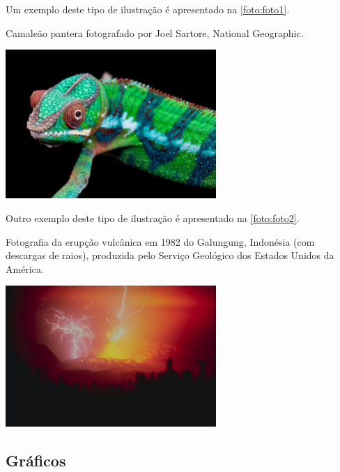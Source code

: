 Um exemplo deste tipo de ilustração é apresentado na \autoref{foto:foto1}.

\begin{photograph}[htb]%
\captionsetup{width=0.6\textwidth}%
\caption{Camaleão pantera fotografado por Joel Sartore, National Geographic.}%
\label{foto:foto1}%
\includegraphics[width=0.6\textwidth]{./CapituloExemplo/foto1}%
\end{photograph}

Outro exemplo deste tipo de ilustração é apresentado na \autoref{foto:foto2}.

\begin{photograph}[htb]%
\captionsetup{width=0.6\textwidth}%
\caption{Fotografia da erupção vulcânica em 1982 do Galungung, Indonésia (com descargas de raios), produzida pelo Serviço Geológico dos Estados Unidos da América.}%
\label{foto:foto2}%
\includegraphics[width=0.6\textwidth]{./CapituloExemplo/foto2}%
\end{photograph}

\subsection{Gráficos}\label{sec:graficos}


